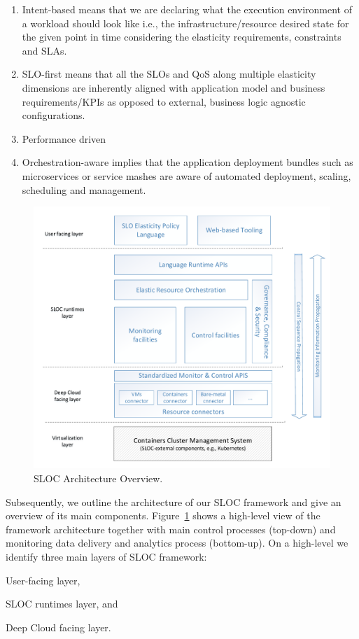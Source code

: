 \begin{enumerate}
	\item Intent-based means that we are declaring what the execution environment
	of a workload should look like i.e., the infrastructure/resource desired state for 
	the given point in time considering the elasticity requirements, constraints and SLAs.
	\item SLO-first means that all the SLOs and QoS along multiple elasticity 
	dimensions are inherently aligned with application model and business 
	requirements/KPIs as opposed to external, business logic agnostic configurations.
	\item Performance driven
	\item Orchestration-aware implies that the application deployment bundles
	such as microservices or service mashes are aware of automated deployment, 
	scaling, scheduling and management.
\end{enumerate}
%
\begin{figure}[t]  
\centering
\includegraphics[width=0.8\columnwidth]{figures/sloc_architecture}
\caption{SLOC Architecture Overview.}
\label{fig:architecture}
\end{figure}%
%
Subsequently, we outline the architecture of our SLOC framework
and give an overview of its main components.
Figure~\ref{fig:architecture} shows a high-level view of the 
framework architecture together with main control 
processes (top-down) and monitoring data delivery and analytics
process (bottom-up).
%
On a high-level we identify three main layers of SLOC framework:
\begin{inparaenum}[i)]
  \item User-facing layer,
  \item SLOC runtimes layer, and
  \item Deep Cloud facing layer.
\end{inparaenum}

